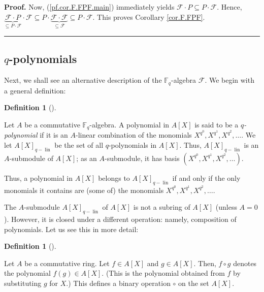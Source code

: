 \documentclass[numbers=enddot,12pt,final,onecolumn,notitlepage]{scrartcl}%
\theoremstyle{definition}
\newtheorem{defi}[theo]{Definition}
\newenvironment{definition}[1][]
{\begin{defi}[#1]\begin{leftbar}}
{\end{leftbar}\end{defi}}
\newenvironment{proof}[1][Proof]{\noindent\textbf{#1.} }{\ \rule{0.5em}{0.5em}}
\begin{document}
\begin{proof}
Now, (\ref{pf.cor.F.FPF.main}) immediately yields $\mathcal{F}\cdot P\subseteq
P\cdot\mathcal{F}$. Hence, $\underbrace{\mathcal{F}\cdot P}_{\subseteq
P\cdot\mathcal{F}}\cdot\mathcal{F}\subseteq P\cdot\underbrace{\mathcal{F}%
\cdot\mathcal{F}}_{\subseteq\mathcal{F}}\subseteq P\cdot\mathcal{F}$. This
proves Corollary \ref{cor.F.FPF}.
\end{proof}

\subsection{$q$-polynomials}

Next, we shall see an alternative description of the $\mathbb{F}_{q}$-algebra
$\mathcal{F}$. We begin with a general definition:

\begin{definition}
\label{def.q-pol}Let $A$ be a commutative $\mathbb{F}_{q}$-algebra. A
polynomial in $A\left[  X\right]  $ is said to be a $q$\textit{-polynomial} if
it is an $A$-linear combination of the monomials $X^{q^{0}},X^{q^{1}}%
,X^{q^{2}},\ldots$. We let $A\left[  X\right]  _{q-\operatorname*{lin}}$ be
the set of all $q$-polynomials in $A\left[  X\right]  $. Thus, $A\left[
X\right]  _{q-\operatorname*{lin}}$ is an $A$-submodule of $A\left[  X\right]
$; as an $A$-submodule, it has basis $\left(  X^{q^{0}},X^{q^{1}},X^{q^{2}%
},\ldots\right)  $.
\end{definition}

Thus, a polynomial in $A\left[  X\right]  $ belongs to $A\left[  X\right]
_{q-\operatorname*{lin}}$ if and only if the only monomials it contains are
(some of) the monomials $X^{q^{0}},X^{q^{1}},X^{q^{2}},\ldots$.

The $A$-submodule $A\left[  X\right]  _{q-\operatorname*{lin}}$ of $A\left[
X\right]  $ is not a subring of $A\left[  X\right]  $ (unless $A=0$). However,
it is closed under a different operation: namely, composition of polynomials.
Let us see this in more detail:

\begin{definition}
\label{def.q-pol.comp}Let $A$ be a commutative ring. Let $f\in A\left[
X\right]  $ and $g\in A\left[  X\right]  $. Then, $f\circ g$ denotes the
polynomial $f\left(  g\right)  \in A\left[  X\right]  $. (This is the
polynomial obtained from $f$ by substituting $g$ for $X$.) This defines a
binary operation $\circ$ on the set $A\left[  X\right]  $.
\end{definition}
\end{document}
